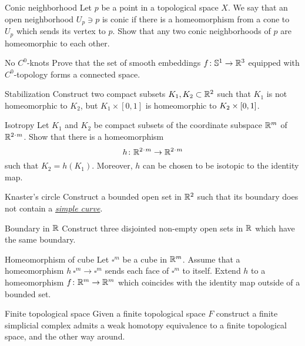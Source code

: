 \documentclass[twoside]{book}
\begin{document}
{\begin{pr}{}{Conic neighborhood}\label{Conic neighborhood}  
Let $p$ be a point in a topological space $X$.
We say that an open neighborhood $U_p\ni p$ is conic
if there is a homeomorphism from a cone
to $U_p$ which sends its vertex to $p$.
Show that any two conic neighborhoods of $p$ are homeomorphic to each other.
\end{pr}

\begin{pr}{}{No $C^0$-knots}\label{No knots}
Prove that the set of smooth embeddings $f\:\mathbb{S}^1\z\to\RR^3$ equipped with $C^0$-topology 
forms a connected space.
\end{pr}

\begin{pr}{}{Stabilization}\label{Simple stabilization}
Construct two compact subsets $K_1, K_2\subset\mathbb{R}^2$ such that
$K_1$ is not homeomorphic to $K_2$, but $K_1\times[0,1]$ is homeomorphic to $K_2\z\times[0,1]$.
\end{pr}

\begin{pr}{}{Isotropy}\label{Isotropy}
Let $K_1$ and $K_2$ be compact subsets of the coordinate subspace $\mathbb{R}^m$ of $\RR^{2\cdot m}$.
Show that there is a homeomorphism 
\[h\:\RR^{2\cdot m}\z\to \RR^{2\cdot m}\] 
such that $K_2=h(K_1)$.
Moreover, $h$ can be chosen to be isotopic to the identity map.
\end{pr}


\begin{pr}{}{Knaster's circle}\label{Knaster's circle} 
Construct 
a bounded open set in $\mathbb{R}^2$ 
such that 
its boundary does not contain a 
\hyperref[Simple curve]{\emph{simple curve}}.
\end{pr}


\begin{pr}{\easy}{Boundary in $\mathbb{R}$}\label{Boundary in R}
Construct three disjointed non-empty open sets in $\mathbb{R}$ which have the same boundary.
\end{pr}

\begin{pr}{}{Homeomorphism of cube}\label{Homeomorphism of cube}
Let $\square^m$ be a cube in $\mathbb{R}^m$.
Assume that a homeomorphism $h\:\square^m\to\square^m$ sends each face of $\square^m$ to itself.
Extend $h$ to a homeomorphism $f\colon\mathbb{R}^m\to\mathbb{R}^m$ which coincides with the identity map outside of a bounded set.    
\end{pr}


\begin{pr}{\easy}{Finite topological space}\label{Finite topological space}
Given a finite topological space $F$ 
construct a finite simplicial complex admits a weak homotopy equivalence  
to a finite topological space, 
and the other way around. 
\end{pr}

}
\end{document}
